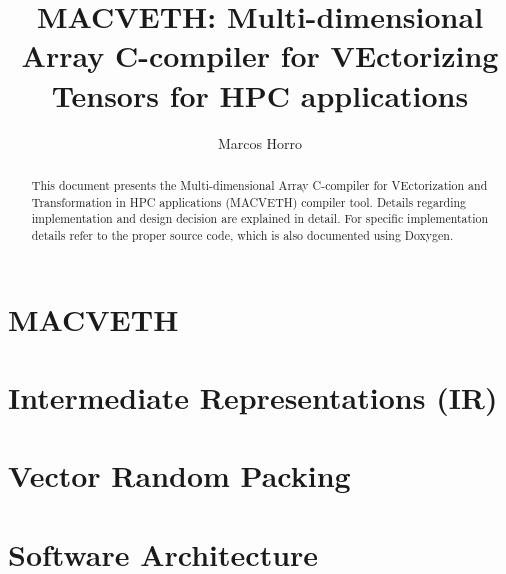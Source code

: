 \documentclass[a4paper,12pt]{IEEEtran}
\title{\textbf{MACVETH}: \textbf{M}ulti-dimensional \textbf{A}rray
    \textbf{C}-compiler for \textbf{VE}ctorizing
    \textbf{T}ensors for \textbf{H}PC applications}
\author{Marcos Horro}
\begin{document}
\maketitle

\begin{abstract}
	This document presents the Multi-dimensional Array C-compiler for VEctorization
	and Transformation in HPC applications (MACVETH) compiler tool. Details
	regarding implementation and design decision are explained in detail. For
	specific implementation details refer to the proper source code, which is also
	documented using Doxygen.
\end{abstract}

\section*{MACVETH}
\label{chapter:Intro}


\section*{Intermediate Representations (IR)}
\label{chapter:IR}


\section*{Vector Random Packing}
\label{chapter:VectorRandom}


\section*{Software Architecture}
\label{chapter:Software}


\newpage


\end{document}
